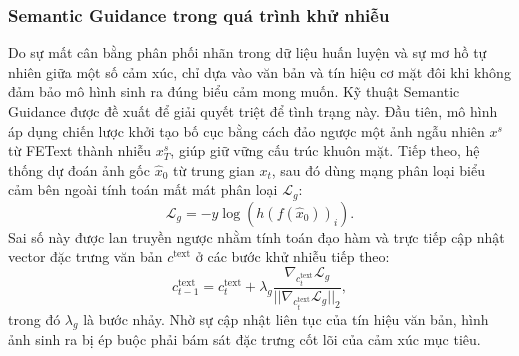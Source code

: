 \subsubsection{Semantic Guidance trong quá trình khử nhiễu}
Do sự mất cân bằng phân phối nhãn trong dữ liệu huấn luyện và sự mơ hồ tự nhiên giữa một số cảm xúc, chỉ dựa vào văn bản và tín hiệu cơ mặt đôi khi không đảm bảo mô hình sinh ra đúng biểu cảm mong muốn. Kỹ thuật Semantic Guidance được đề xuất để giải quyết triệt để tình trạng này. Đầu tiên, mô hình áp dụng chiến lược khởi tạo bố cục bằng cách đảo ngược một ảnh ngẫu nhiên $x^s$ từ FEText thành nhiễu $x_T^s$, giúp giữ vững cấu trúc khuôn mặt. Tiếp theo, hệ thống dự đoán ảnh gốc $\hat{x}_0$ từ trung gian $x_t$, sau đó dùng mạng phân loại biểu cảm bên ngoài tính toán mất mát phân loại $\mathcal{L}_g$:
\begin{equation}
    \mathcal{L}_{g} = -y\log(h(f(\hat{x}_0))_i).
\end{equation}
Sai số này được lan truyền ngược nhằm tính toán đạo hàm và trực tiếp cập nhật vector đặc trưng văn bản $c^{\text{text}}$ ở các bước khử nhiễu tiếp theo:
\begin{equation}
    c^{\text{text}}_{t-1} = c^{\text{text}}_{t} + \lambda_{g} \frac{ \nabla_{c^{\text{text}}_{t}} \mathcal{L}_{g}} {||\nabla_{c^{\text{text}}_{t}} \mathcal{L}_{g}||_2},
\end{equation}
trong đó $\lambda_g$ là bước nhảy. Nhờ sự cập nhật liên tục của tín hiệu văn bản, hình ảnh sinh ra bị ép buộc phải bám sát đặc trưng cốt lõi của cảm xúc mục tiêu.